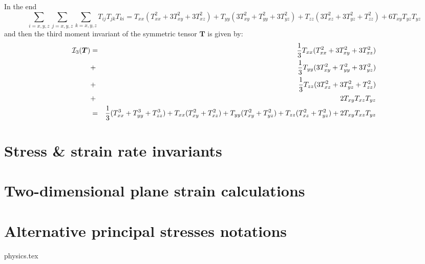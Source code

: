 In the end 
\[
\sum_{i=x,y,z} \sum_{j=x,y,z} \sum_{k=x,y,z}
T_{ij}T_{jk}T_{ki}
= T_{xx}( T_{xx}^2 + 3T_{xy}^2 + 3T_{xz}^2)
+ T_{yy}(3T_{xy}^2 +  T_{yy}^2 + 3T_{yz}^2   )
+ T_{zz}(3T_{xz}^2 + 3T_{yz}^2 + T_{zz}^2  )
+6T_{xy}T_{yz}T_{yz}
\]
and then the third moment invariant of the symmetric tensor ${\bm T}$
is given by:
\begin{eqnarray}
{\cal I}_3({\bm T}) 
&=& \frac{1}{3} T_{xx} (  T_{xx}^2 + 3 T_{xy}^2 + 3 T_{xz}^2  )     \nonumber\\
&+& \frac{1}{3} T_{yy} (3 T_{xy}^2 +   T_{yy}^2 + 3 T_{yz}^2  )     \nonumber\\
&+& \frac{1}{3} T_{zz} (3 T_{xz}^2 + 3 T_{yz}^2 +   T_{zz}^2)       \nonumber\\
&+& 2 T_{xy} T_{xz} T_{yz} \\
&=& \frac{1}{3} (T_{xx}^3+T_{yy}^3+T_{zz}^3) 
+T_{xx} ( T_{xy}^2 +  T_{xz}^2  ) 
+T_{yy} ( T_{xy}^2 +  T_{yz}^2  ) 
+T_{zz} ( T_{xz}^2 +  T_{yz}^2  ) + 2 T_{xy} T_{xz} T_{yz} 
\end{eqnarray}



\newpage
\section{Stress \& strain rate invariants}\label{sec:stress_invariants}


\section{Two-dimensional plane strain calculations \label{ss:plane_strain}} 










\section{Alternative principal stresses notations}\label{sec:altinv}
\begin{flushright} {\tiny {\color{gray} physics.tex}} \end{flushright}

